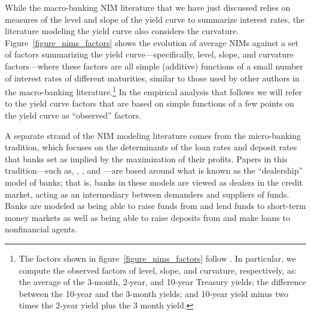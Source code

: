\documentclass[11pt]{article}
\renewcommand{\baselinestretch}{1.5}
\begin{document}
While the macro-banking NIM literature that we have just discussed relies on measures of the level and slope of the yield curve to summarize interest rates, the literature modeling the yield curve also considers the curvature.  Figure~\ref{figure_nims_factors} shows the evolution of average NIMs against a set of factors summarizing the yield curve---specifically, level, slope, and curvature factors---where these factors are all simple (additive) functions of a small number of interest rates of different maturities, similar to those used by other authors in the macro-banking literature.\renewcommand{\baselinestretch}{1.0}\footnote{The factors shown in figure~\ref{figure_nims_factors} follow .  In particular, we compute the observed factors of level, slope, and curvature, respectively, as: the average of the 3-month, 2-year, and 10-year Treasury yields; the difference between the 10-year and the 3-month yields; and 10-year yield minus two times the 2-year yield plus the 3 month yield.\vspace{0.05in}}\renewcommand{\baselinestretch}{1.5} In the empirical analysis that follows we will refer to the yield curve factors that are based on simple functions of a few points on the yield  curve as ``observed'' factors.  

A separate strand of the NIM modeling literature comes from the micro-banking tradition, which focuses on the determinants of the loan rates and deposit rates that banks set as implied by the maximization of their profits. Papers in this tradition---such as, , , and ---are based around what is known as the ``dealership'' model of banks; that is, banks in these models are viewed as dealers in the credit market, acting as an intermediary between demanders and suppliers of funds.  Banks are modeled as being able to raise funds from and lend funds to short-term money markets as well as being able to raise deposits from and make loans to nonfinancial agents.
\end{document}
